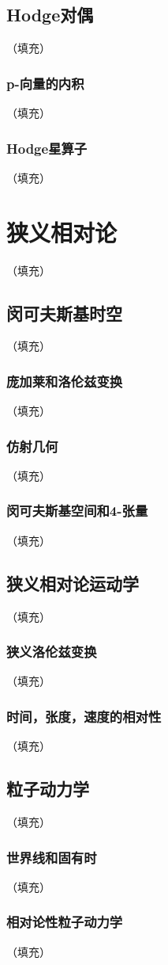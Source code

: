 \documentclass[hyperref,UTF8]{ctexbook}
\begin{document}
\section{Hodge对偶}（填充）
\subsection{p-向量的内积}（填充）
\subsection{Hodge星算子}（填充）
\chapter{狭义相对论}\label{chp:9}（填充）
\section{闵可夫斯基时空}（填充）
\subsection{庞加莱和洛伦兹变换}（填充）
\subsection{仿射几何}（填充）
\subsection{闵可夫斯基空间和4-张量}（填充）
\section{狭义相对论运动学}（填充）
\subsection{狭义洛伦兹变换}（填充）
\subsection{时间，张度，速度的相对性}（填充）
\section{粒子动力学}（填充）
\subsection{世界线和固有时}（填充）
\subsection{相对论性粒子动力学}（填充）
\end{document}
